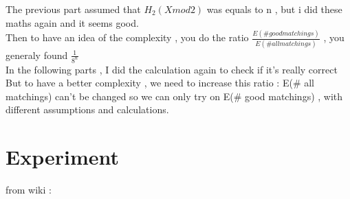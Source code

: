 \documentclass{article}
\begin{document}
The previous part assumed that $H_{2}(X mod 2)$ was equals to n , but i did these maths again and it seems good.\\
Then to have an idea of the complexity , you do the ratio $\frac{E(\# good matchings)}{E(\# all matchings)}$ , you generaly found $\frac{1}{8^n}$\\
In the following parts , I did the calculation again to check if it's really correct\\
But to have a better complexity , we need to increase this ratio : E(\# all matchings) can't be changed so we can only try on E(\# good matchings) , with different assumptions and calculations.\\

\section{Experiment}
from wiki :\\
\end{document}
